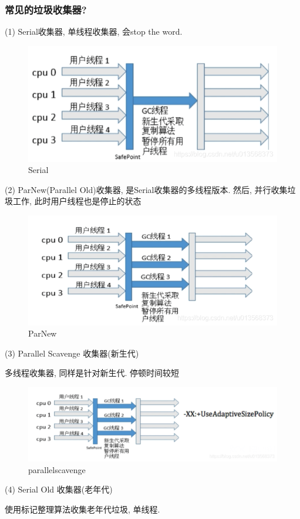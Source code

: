 \documentclass[UTF8]{ctexart}
\begin{document}
\subsubsection{常见的垃圾收集器?}
(1) Serial收集器, 单线程收集器, 会stop the word. \par
\begin{figure}
	\centering
	\includegraphics[width=0.7\linewidth]{figures/Serial.png}
	\caption{Serial}
	\label{fig:Serial}
\end{figure}
(2) ParNew(Parallel Old)收集器, 是Serial收集器的多线程版本. 然后, 并行收集垃圾工作, 此时用户线程也是停止的状态 \par
\begin{figure}
	\centering
	\includegraphics[width=0.7\linewidth]{figures/ParNew.png}
	\caption{ParNew}
	\label{fig:ParNew}
\end{figure}
(3) Parallel Scavenge 收集器(新生代) \par
多线程收集器, 同样是针对新生代. 停顿时间较短 \par
\begin{figure}
	\centering
	\includegraphics[width=0.7\linewidth]{figures/parallelscavenge.png}
	\caption{parallelscavenge}
	\label{fig:parallelscavenge}
\end{figure}
(4) Serial Old 收集器(老年代) \par
使用标记整理算法收集老年代垃圾, 单线程. \par
\end{document}
